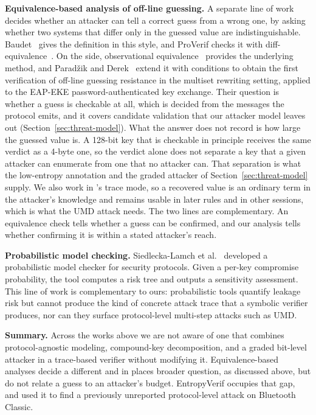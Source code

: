 \noindent\textbf{Equivalence-based analysis of off-line guessing.}
A separate line of work decides whether an attacker can tell a correct guess from a wrong one, by
asking whether two systems that differ only in the guessed value are indistinguishable.
Baudet~\cite{baudet2005guessing} gives the definition in this style, and ProVerif checks it with
diff-equivalence~\cite{blanchet2005equivalences}.
On the \Tamarin{} side, observational equivalence~\cite{basin2015obseq} provides the underlying
method, and Parad\v{z}ik and Derek~\cite{paradzik2022conditional} extend it with conditions to
obtain the first verification of off-line guessing resistance in the multiset rewriting setting,
applied to the EAP-EKE password-authenticated key exchange.
Their question is whether a guess is checkable at all, which is decided from the messages the
protocol emits, and it covers candidate validation that our attacker model leaves out
(Section~\ref{sec:threat-model}).
What the answer does not record is how large the guessed value is. A 128-bit key that is checkable
in principle receives the same verdict as a 4-byte one, so the verdict alone does not separate a
key that a given attacker can enumerate from one that no attacker can.
That separation is what the low-entropy annotation and the graded attacker of
Section~\ref{sec:threat-model} supply.
We also work in \Tamarin{}'s trace mode, so a recovered value is an ordinary term in the
attacker's knowledge and remains usable in later rules and in other sessions, which is what the
UMD attack needs.
The two lines are complementary. An equivalence check tells whether a guess can be confirmed, and
our analysis tells whether confirming it is within a stated attacker's reach.

\noindent\textbf{Probabilistic model checking.}
Siedlecka-Lamch et al.~\cite{siedlecka2016probabilistic} developed a probabilistic model checker for security protocols.
Given a per-key compromise probability, the tool computes a risk tree and outputs a sensitivity assessment.
This line of work is complementary to ours: probabilistic tools quantify leakage risk but cannot produce the kind of concrete attack trace that a symbolic verifier produces, nor can they surface protocol-level multi-step attacks such as UMD.

\noindent\textbf{Summary.}
Across the works above we are not aware of one that combines protocol-agnostic modeling,
compound-key decomposition, and a graded bit-level attacker in a trace-based verifier without
modifying it.
Equivalence-based analyses decide a different and in places broader question, as discussed above,
but do not relate a guess to an attacker's budget.
EntropyVerif occupies that gap, and used it to find a previously unreported protocol-level attack
on Bluetooth Classic.
